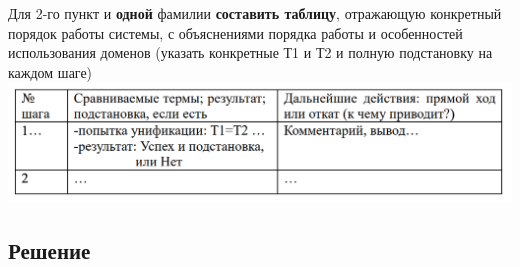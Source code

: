 Для 2-го пункт и  \textbf{одной} фамилии  \textbf{составить таблицу}, отражающую конкретный
порядок работы системы, с объяснениями порядка работы и особенностей использования
доменов (указать конкретные Т1 и Т2 и полную подстановку на каждом шаге)
\includegraphics[scale=0.6]{./inc/img/tb_tmpl}


\clearpage
\subsection*{Решение}
